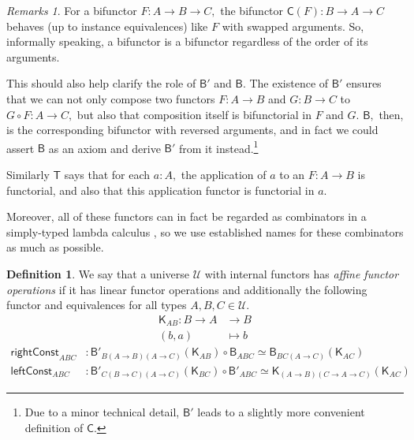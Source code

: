 \documentclass[a4paper]{article}
\theoremstyle{definition}
\newtheorem{definition}{Definition}[section]
\theoremstyle{remark}
\newtheorem*{remarks}{Remarks}
\newcommand{\defn}{\emph}
\renewcommand{\equiv}{\simeq}
\newcommand{\U}{\mathcal{U}}
\newcommand{\nm}{\mathsf}
\newcommand{\combinator}{\nm}
\newcommand{\revAppFun}{\combinator{T}}
\newcommand{\constFun}{\combinator{K}}
\newcommand{\compFun}{\combinator{B'}}
\newcommand{\revCompFun}{\combinator{B}}
\newcommand{\swapFun}{\combinator{C}}
\begin{document}
\begin{remarks}
  For a bifunctor $F : A \to B \to C,$ the bifunctor $\swapFun(F) : B \to A \to C$ behaves
  (up to instance equivalences) like $F$ with swapped arguments. So, informally speaking,
  a bifunctor is a bifunctor regardless of the order of its arguments.

  This should also help clarify the role of $\compFun$ and $\revCompFun.$ The existence
  of $\compFun$ ensures that we can not only compose two functors $F : A \to B$ and
  $G : B \to C$ to $G \circ F : A \to C,$ but also that composition itself is bifunctorial
  in $F$ and $G.$ $\revCompFun,$ then, is the corresponding bifunctor with reversed
  arguments, and in fact we could assert $\revCompFun$ as an axiom and derive $\compFun$
  from it instead.\footnote{Due to a minor technical detail, $\compFun$ leads to a slightly
  more convenient definition of $\swapFun.$}

  Similarly $\revAppFun$ says that for each $a : A,$ the application of $a$ to an
  $F : A \to B$ is functorial, and also that this application functor is functorial in
  $a.$

  Moreover, all of these functors can in fact be regarded as combinators \cite{combinators}
  in a simply-typed lambda calculus \cite{simply-typed-lambda-calculus}, so we use
  established names for these combinators as much as possible.
\end{remarks}

\vspace{1ex}
\begin{definition}
  We say that a universe $\U$ with internal functors has \defn{affine functor
  operations} if it has linear functor operations and additionally the following functor
  and equivalences for all types $A,B,C \in \U.$
  \begin{align*}
    \constFun_{AB} : B \to A &\to     B\\
                     (b,a)   &\mapsto b
  \end{align*}
  \begin{align*}
    \nm{rightConst}_{ABC} &: \compFun_{B(A{\to}B)(A{\to}C)}(\constFun_{AB}) \circ \revCompFun_{ABC} \equiv \revCompFun_{BC(A{\to}C)}(\constFun_{AC})\\
    \nm{leftConst}_{ABC}  &: \compFun_{C(B{\to}C)(A{\to}C)}(\constFun_{BC}) \circ \compFun_{ABC} \equiv \constFun_{(A{\to}B)(C{\to}A{\to}C)}(\constFun_{AC})
  \end{align*}
\end{definition}
\end{document}
